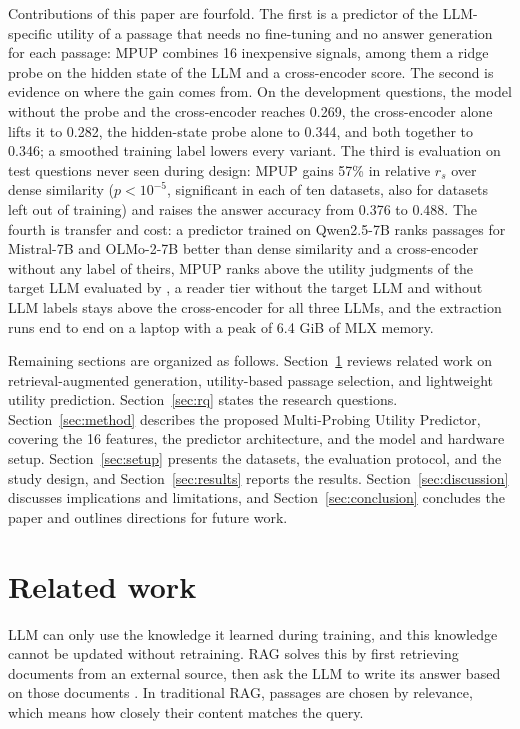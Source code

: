 \documentclass[preprint,12pt,authoryear]{elsarticle}
\begin{document}
Contributions of this paper are fourfold. The first is a predictor of the LLM-specific utility of a passage that needs no fine-tuning and no answer generation for each passage: MPUP combines 16 inexpensive signals, among them a ridge probe on the hidden state of the LLM and a cross-encoder score. The second is evidence on where the gain comes from. On the development questions, the model without the probe and the cross-encoder reaches 0.269, the cross-encoder alone lifts it to 0.282, the hidden-state probe alone to 0.344, and both together to 0.346; a smoothed training label lowers every variant. The third is evaluation on test questions never seen during design: MPUP gains 57\% in relative $r_s$ over dense similarity ($p < 10^{-5}$, significant in each of ten datasets, also for datasets left out of training) and raises the answer accuracy from 0.376 to 0.488. The fourth is transfer and cost: a predictor trained on Qwen2.5-7B ranks passages for Mistral-7B and OLMo-2-7B better than dense similarity and a cross-encoder without any label of theirs, MPUP ranks above the utility judgments of the target LLM evaluated by \citet{zhang2025c}, a reader tier without the target LLM and without LLM labels stays above the cross-encoder for all three LLMs, and the extraction runs end to end on a laptop with a peak of 6.4 GiB of MLX memory.

Remaining sections are organized as follows. Section~\ref{sec:related} reviews related work on retrieval-augmented generation, utility-based passage selection, and lightweight utility prediction. Section~\ref{sec:rq} states the research questions. Section~\ref{sec:method} describes the proposed Multi-Probing Utility Predictor, covering the 16 features, the predictor architecture, and the model and hardware setup. Section~\ref{sec:setup} presents the datasets, the evaluation protocol, and the study design, and Section~\ref{sec:results} reports the results. Section~\ref{sec:discussion} discusses implications and limitations, and Section~\ref{sec:conclusion} concludes the paper and outlines directions for future work.

\section{Related work}\label{sec:related}
LLM can only use the knowledge it learned during training, and this knowledge cannot be updated without retraining. RAG solves this by first retrieving documents from an external source, then ask the LLM to write its answer based on those documents \citep{fan2024}. In traditional RAG, passages are chosen by relevance, which means how closely their content matches the query.
\end{document}
